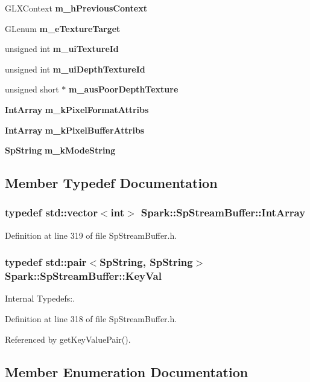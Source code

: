 \begin{CompactItemize}
GLXContext {\bf m\_\-h\-Previous\-Context}
\item 
GLenum {\bf m\_\-e\-Texture\-Target}
\item 
unsigned int {\bf m\_\-ui\-Texture\-Id}
\item 
unsigned int {\bf m\_\-ui\-Depth\-Texture\-Id}
\item 
unsigned short $\ast$ {\bf m\_\-aus\-Poor\-Depth\-Texture}
\item 
{\bf Int\-Array} {\bf m\_\-k\-Pixel\-Format\-Attribs}
\item 
{\bf Int\-Array} {\bf m\_\-k\-Pixel\-Buffer\-Attribs}
\item 
{\bf Sp\-String} {\bf m\_\-k\-Mode\-String}
\end{CompactItemize}


\subsection{Member Typedef Documentation}
\subsubsection{\setlength{\rightskip}{0pt plus 5cm}typedef std::vector$<$int$>$ {\bf Spark::Sp\-Stream\-Buffer::Int\-Array}\hspace{0.3cm}{\tt  [protected]}}\label{classSpark_1_1SpStreamBuffer_x1}


Definition at line 319 of file Sp\-Stream\-Buffer.h.
\subsubsection{\setlength{\rightskip}{0pt plus 5cm}typedef std::pair$<${\bf Sp\-String}, {\bf Sp\-String}$>$ {\bf Spark::Sp\-Stream\-Buffer::Key\-Val}\hspace{0.3cm}{\tt  [protected]}}\label{classSpark_1_1SpStreamBuffer_x0}


Internal Typedefs:. 

Definition at line 318 of file Sp\-Stream\-Buffer.h.

Referenced by get\-Key\-Value\-Pair().

\subsection{Member Enumeration Documentation}

